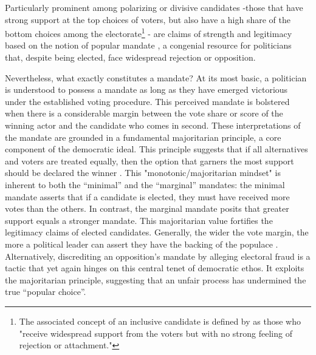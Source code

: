 \documentclass[hidelinks,11pt]{article} \usepackage[utf8]{inputenc}
\begin{document}
Particularly prominent among polarizing or divisive candidates -those that have
strong support at the top choices of voters, but also have a high share of the
bottom choices among the electorate\footnote{The associated concept of an
  inclusive candidate is defined by
  \textcite[p.6]{igersheim22_compar_votin_method} as those who "receive
  widespread support from the voters but with no strong feeling of rejection or
  attachment."} - are claims of strength and legitimacy based on the notion of
popular mandate \parencite{tabarrok2001president}, a congenial resource for
politicians that, despite being elected, face widespread rejection or
opposition.

Nevertheless, what exactly constitutes a mandate? At its most basic, a politician is understood to possess a mandate as long as they have emerged victorious under the established voting procedure. This perceived mandate is bolstered when there is a considerable margin between the vote share or score of the winning actor and the candidate who comes in second. These interpretations of the mandate are grounded in a fundamental majoritarian principle, a core component of the democratic ideal. This principle suggests that if all alternatives and voters are treated equally, then the option that garners the most support should be declared the winner \parencite{dahl1989democracy}. This "monotonic/majoritarian mindset" is inherent to both the ``minimal'' and the ``marginal'' mandates: the minimal mandate asserts that if a candidate is elected, they must have received more votes than the others. In contrast, the marginal mandate posits that greater support equals a stronger mandate. This majoritarian value fortifies the legitimacy claims of elected candidates. Generally, the wider the vote margin, the more a political leader can assert they have the backing of the populace \parencite{grossman2022majoritarian}. Alternatively, discrediting an opposition's mandate by alleging electoral fraud is a tactic that yet again hinges on this central tenet of democratic ethos. It exploits the majoritarian principle, suggesting that an unfair process has undermined the true ``popular choice''.
\end{document}
